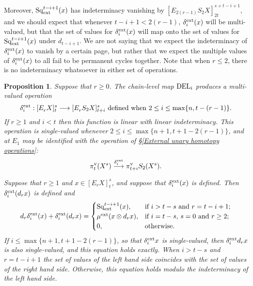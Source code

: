 \documentclass[11pt]{amsart} \renewcommand{\baselinestretch}{1.2}
\theoremstyle{plain}
\newtheorem{prop}[thm]{Proposition}
\numberwithin{equation}{section} %
\theoremstyle{plain}
\newtheorem{prop}[thm]{Proposition}
\numberwithin{equation}{chapter} %
\renewcommand{\to}{\longrightarrow}
\newcommand{\Sq}{\mathrm{Sq}}
\newcommand{\E}[5]{[E^{#1}_{#2}#3]^{#4}_{#5}}
\newcommand{\Edownup}[5]{[E_{#1}^{#2}#3]^{#4}_{#5}}
\newcommand{\uver}{^\mathrm{v}}
\begin{document}
\begin{second quadrant homotopy sseq operations}
Moreover,  $\Sq^{t-i+1}_\textup{ext}(x)$ has indeterminacy vanishing by $\Edownup{2(r-1)}{}{S_2X}{s+t-i+1}{2t}$, and we should expect that whenever $t-i+1<2(r-1)$, $\delta^\textup{ext}_i(x)$ will be multi-valued, but that the set of values for $\delta^\textup{ext}_i(x)$ will map onto the set of values for $\Sq_\textup{ext}^{t-i+1}(x)$ under $d_{t-i+1}$. 
We are not saying that we expect the indeterminacy of $\delta^\textup{ext}_i(x)$ to vanish by a certain page, but rather that we expect the  multiple values of $\delta^\textup{ext}_i(x)$ to all fail to be permanent cycles together. Note that when $r\leq 2$, there is no indeterminacy whatsoever in either set of operations.
\begin{prop}
\label{Prop on delta external}
Suppose that $r\geq0$. The chain-level map $\textup{DEL}_i$ produces a  multi-valued operation 
\[\delta^\textup{ext}_i:\Edownup{r}{}{X}{s}{t}\to \Edownup{r}{}{S_2X}{s}{t+i}\text{ defined when }2\leq i\leq \max\{n,t-(r-1)\}.\] If $r\geq1$ and $i<t$ then this function is linear with linear indeterminacy. This operation is single-valued whenever $2\leq i\leq \max\{n+1,t+1-2(r-1)\}$, and at $E_1$ may be identified with the operation of \S\ref{External unary homotopy operations}:
\[\pi\uver_{t}( X^s)\overset{\delta_i^\textup{ext}}{\to} \pi\uver_{t+i}S_2(X^s).\]

Suppose that $r\geq1$ and $x\in \E{}{r}{X}{s}{t}$, and suppose that $\delta^\textup{ext}_i ( x)$ is defined. Then $\delta^\textup{ext}_i (d_r x)$ is defined and 
\[d_r\delta^\textup{ext}_i(x)+ \delta^\textup{ext}_i(d_rx)=\begin{cases}
\Sq_\textup{ext}^{t-i+1}(x),&\textup{if $i>t-s$ and $r =t-i+1$};\\
\mu^\textup{ext}(x\otimes d_rx),&\textup{if $i=t-s$,  $s=0$ and $r\geq2$};\\
0,&\textup{otherwise.}
\end{cases}\]
If $i\leq \max\{n+1,t+1-2(r-1)\}$, so that $\delta^\textup{ext}_i x$ is single-valued, then $\delta^\textup{ext}_i d_r x$  is also single-valued, and this equation holds exactly.  When $i>t-s$ and $r =t-i+1$ the set of values of the left hand side coincides with the set of values of the right hand side. Otherwise, this equation holds modulo the indeterminacy of the left hand side. 


\end{prop}
\end{second quadrant homotopy sseq operations}
\end{document}
